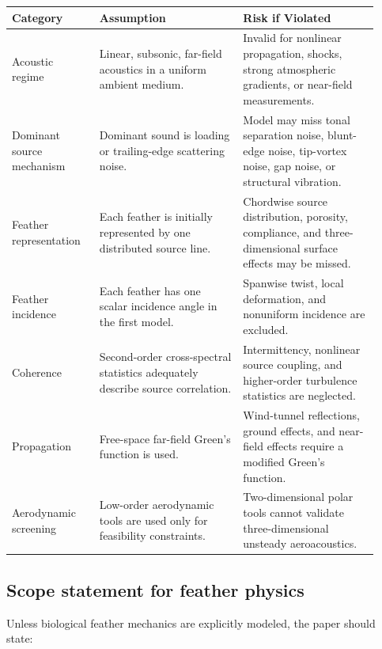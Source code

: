 \documentclass[11pt]{article}
\begin{document}
\begin{longtable}{p{0.22\linewidth} p{0.36\linewidth} p{0.34\linewidth}}
\toprule
\textbf{Category} & \textbf{Assumption} & \textbf{Risk if Violated} \\
\midrule
\endhead

Acoustic regime
&
Linear, subsonic, far-field acoustics in a uniform ambient medium.
&
Invalid for nonlinear propagation, shocks, strong atmospheric gradients, or near-field measurements.
\\

Dominant source mechanism
&
Dominant sound is loading or trailing-edge scattering noise.
&
Model may miss tonal separation noise, blunt-edge noise, tip-vortex noise, gap noise, or structural vibration.
\\

Feather representation
&
Each feather is initially represented by one distributed source line.
&
Chordwise source distribution, porosity, compliance, and three-dimensional surface effects may be missed.
\\

Feather incidence
&
Each feather has one scalar incidence angle in the first model.
&
Spanwise twist, local deformation, and nonuniform incidence are excluded.
\\

Coherence
&
Second-order cross-spectral statistics adequately describe source correlation.
&
Intermittency, nonlinear source coupling, and higher-order turbulence statistics are neglected.
\\

Propagation
&
Free-space far-field Green's function is used.
&
Wind-tunnel reflections, ground effects, and near-field effects require a modified Green's function.
\\

Aerodynamic screening
&
Low-order aerodynamic tools are used only for feasibility constraints.
&
Two-dimensional polar tools cannot validate three-dimensional unsteady aeroacoustics.
\\

\bottomrule
\end{longtable}

\subsection{Scope statement for feather physics}

Unless biological feather mechanics are explicitly modeled, the paper should state:
\end{document}
